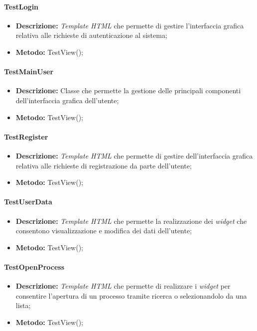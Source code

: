 \paragraph{TestLogin}
\begin{itemize}
\item \textbf{Descrizione:} \textit{Template HTML} che permette di gestire l'interfaccia grafica relativa alle richieste di autenticazione al sistema;
\item \textbf{Metodo:} TestView();
\end{itemize}

\paragraph{TestMainUser}
\begin{itemize}
\item \textbf{Descrizione:} Classe che permette la gestione delle principali componenti dell'interfaccia grafica dell'utente;
\item \textbf{Metodo:} TestView();
\end{itemize}

\paragraph{TestRegister}
\begin{itemize}
\item \textbf{Descrizione:} \textit{Template HTML} che permette di gestire dell'interfaccia grafica relativa alle richieste di registrazione da parte dell'utente;
\item \textbf{Metodo:} TestView();
\end{itemize}

\paragraph{TestUserData}
\begin{itemize}
\item \textbf{Descrizione:} \textit{Template HTML} che permette la realizzazione dei \textit{widget} che consentono visualizzazione e modifica dei dati dell'utente;
\item \textbf{Metodo:} TestView();
\end{itemize}

\paragraph{TestOpenProcess}
\begin{itemize}
\item \textbf{Descrizione:} \textit{Template HTML} che permette di realizzare i \textit{widget} per consentire l'apertura di un processo tramite ricerca o selezionandolo da una lista;
\item \textbf{Metodo:} TestView();
\end{itemize}

